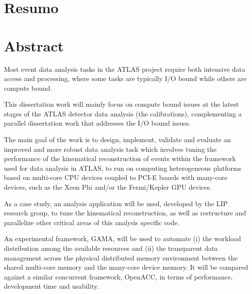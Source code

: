 
\chapter*{Resumo}

\newpage {}
\chapter*{Abstract}

Most event data analysis tasks in the ATLAS project require both intensive data access and processing, where some tasks are typically I/O bound while others are compute bound.

This dissertation work will mainly focus on compute bound issues at the latest stages of the ATLAS detector data analysis (the calibrations), complementing a parallel dissertation work that addresses the I/O bound issues.

The main goal of the work is to design, implement, validate and evaluate an improved and more robust data analysis task which involves tuning the performance of the kinematical reconstruction of events within the framework used for data analysis in ATLAS, to run on computing heterogeneous platforms based on multi-core CPU devices coupled to PCI-E boards with many-core devices, such as the \intel Xeon Phi and/or the \nvidia Fermi/Kepler GPU devices.

As a case study, an analysis application will be used, developed by the LIP research group, to tune the kinematical reconstruction, as well as restructure and parallelize other critical areas of this analysis specific code.

An experimental framework, GAMA, will be used to automate (i) the workload distribution among the available resources and (ii) the transparent data management across the physical distributed memory environment between the shared multi-core memory and the many-core device memory. It will be compared against a similar concurrent framework, OpenACC, in terms of performance, development time and usability.

\newpage
{}
